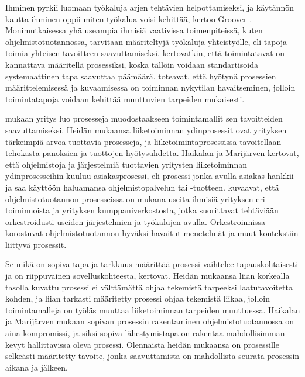 \documentclass[finnish,12pt,a4paper,pdftex]{article}
\begin{document}
 
Ihminen pyrkii luomaan työkaluja arjen tehtävien helpottamiseksi, ja käytännön kautta ihminen oppii miten työkalua voisi kehittää, kertoo Groover \citeyearpar{groover}. Monimutkaisessa yhä useampia ihmisiä vaativissa toimenpiteissä, kuten ohjelmistotuotannossa, tarvitaan määriteltyjä työkaluja yhteistyölle, eli tapoja toimia yhteisen tavoitteen saavuttamiseksi. \citeauthor{leanit} \citeyearpar{leanit} kertovatkin, että toimintatavat on kannattava määritellä prosessiksi, koska tällöin voidaan standartisoida systemaattinen tapa saavuttaa päämäärä. \citeauthor{leanit} toteavat, että hyötynä prosessien määrittelemisessä ja kuvaamisessa on toiminnan nykytilan havaitseminen, jolloin toimintatapoja voidaan kehittää muuttuvien tarpeiden mukaisesti.

\cite{teollisuustalous} mukaan yritys luo prosesseja muodostaakseen toimintamallit sen tavoitteiden saavuttamiseksi. Heidän mukaansa liiketoiminnan ydinprosessit ovat yrityksen tärkeimpiä arvoa tuottavia prosesseja, ja liiketoimintaprosessissa tavoitellaan tehokasta panoksien ja tuottojen hyötysuhdetta. Haikalan ja Marijärven \citeyearpar{ohjelmistotuotanto} kertovat, että ohjelmistoja ja järjestelmiä tuottavien yritysten liiketoiminnan ydinprosesseihin kuuluu asiakasprosessi, eli prosessi jonka avulla asiakas hankkii ja saa käyttöön haluamansa ohjelmistopalvelun tai -tuotteen. \cite{okaytannot} kuvaavat, että ohjelmistotuotannon prosesseissa on mukana useita ihmisiä yrityksen eri toiminnoista ja yrityksen kumppaniverkostosta, jotka suorittavat tehtäviään orkestroidusti useiden järjestelmien ja työkalujen avulla. Orkestroinnissa korostuvat ohjelmistotuotannon hyväksi havaitut menetelmät ja muut kontekstiin liittyvä prosessit.
 
Se mikä on sopiva tapa ja tarkkuus määrittää prosessi vaihtelee tapauskohtaisesti ja on riippuvainen sovelluskohteesta, \cite{ohjelmistotuotanto} kertovat. Heidän mukaansa liian korkealla tasolla kuvattu prosessi ei välttämättä ohjaa tekemistä tarpeeksi laatutavoitetta kohden, ja liian tarkasti määritetty prosessi ohjaa tekemistä liikaa, jolloin toimintamalleja on työläs muuttaa liiketoiminnan tarpeiden muuttuessa. Haikalan ja Marijärven mukaan sopivan prosessin rakentaminen ohjelmistotuotannossa on aina kompromissi, ja siksi sopiva lähestymistapa on rakentaa mahdollisimman kevyt hallittavissa oleva prosessi. Olennaista heidän mukaansa on prosessille selkeästi määritetty tavoite, jonka saavuttamista on mahdollista seurata prosessin aikana ja jälkeen. 
\end{document}
